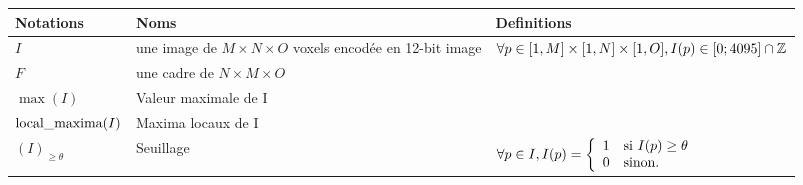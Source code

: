 \documentclass[\main/main.tex]{subfiles}
\begin{document}
\begin{table}[!h]

\scriptsize

    \begin{center}
        \begin{tabular}{p{}p{}p{}}
                Notations & %
                Noms &      %
                Definitions %
                \\
                \midrule
                $I$ &
                une image de $M \times N \times O$ voxels encodée en 12-bit image &
                $\forall p\in[1,M]\times[1,N]\times[1,O],\newline I(p)\in[0;4095] \cap \mathbb{Z} $ %
                \\
                $F$ &
                une cadre de $N \times M \times O$ &
                \\
                $ \max(I) $ &
                Valeur maximale de I &
                $ $ %
                \\
                $ \operatorname{\textnormal{local\_maxima}}(I) $ &
                Maxima locaux de I &
                $ $
                \\
                $(I)_{\ge \theta} $ &
                Seuillage &
                $\forall p \in I,\newline I(p)=\left\{
                    \begin{array}{ll}
                    1 & \mbox{si } I(p) \ge \theta \\
                    0 & \mbox{sinon.}
                    \end{array}
                    \right.$
                \\

\end{tabular}
\end{center}
\end{table}
\end{document}
